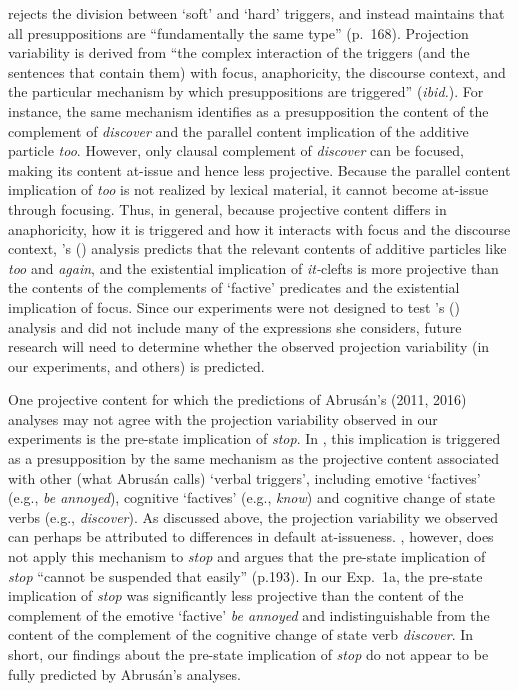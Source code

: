 \documentclass[11pt,fleqn]{article}
\newcommand{\6}{\mbox{$[\hspace*{-.6mm}[$}}
\newcommand{\9}{\mbox{$]\hspace*{-.6mm}]$}}
\newcommand{\citetpos}[1]{\citeauthor{#1}'s (\citeyear{#1})}
\begin{document}
\citet{abrusan2016} rejects the division between `soft' and `hard' triggers, and instead maintains that all presuppositions are ``fundamentally the same type'' (p.\ 168). Projection variability is derived from ``the complex interaction of the triggers (and the sentences that contain them) with focus, anaphoricity, the discourse context, and the particular mechanism by which presuppositions are triggered'' ({\em ibid.}). For instance, the same mechanism identifies as a presupposition the content of the complement of {\em discover} and the parallel content implication of the additive particle {\em too}. However, only clausal complement of {\em discover} can be focused, making its content at-issue and hence less projective. Because the parallel content implication of {\em too} is not realized by lexical material, it cannot become at-issue through focusing. Thus, in general, because projective content differs in anaphoricity, how it is triggered and how it interacts with focus and the discourse context, \citetpos{abrusan2016} analysis predicts that the relevant contents of additive particles like {\em too} and {\em again}, and the existential implication of {\em it-}clefts is more projective than the contents of the complements of `factive' predicates and the existential implication of focus. Since our experiments were not designed to test \citetpos{abrusan2016} analysis and did not include many of the expressions she considers, future research will need to determine whether the observed projection variability (in our experiments, and others) is predicted.

One projective content for which the predictions of Abrus\'an's (2011, 2016) analyses may not agree with the projection variability observed in our experiments is the pre-state implication of {\em stop}. In \citealt{abrusan2011}, this implication is triggered as a presupposition by the same mechanism as the projective content associated with other (what Abrus\'an calls) `verbal triggers', including emotive `factives' (e.g., {\em be annoyed}), cognitive `factives' (e.g., {\em know}) and cognitive change of state verbs (e.g., {\em discover}). As discussed above, the projection variability we observed can perhaps be attributed to differences in default at-issueness.  \citet{abrusan2016}, however, does not apply this mechanism to {\em stop} and   argues that the pre-state implication of {\em stop} ``cannot be suspended that easily'' (p.193). In our Exp.~1a, the pre-state implication of {\em stop} was significantly less projective than the content of the complement of the emotive `factive' {\em be annoyed} and indistinguishable from the content of the complement of the cognitive change of state verb {\em discover}. In short, our findings about the pre-state implication of {\em stop} do not appear to be fully predicted by Abrus\'an's analyses. 
\end{document}
